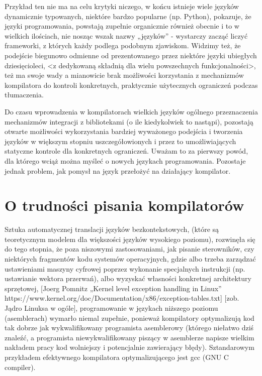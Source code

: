 Przykład ten nie ma na celu krytyki niczego, w końcu istnieje wiele języków dynamicznie typowanych, niektóre bardzo popularne (np. Python), pokazuje,  że języki programowania, powstają zupełnie organicznie również obecnie i to w wielkich ilościach, nie nosząc wszak nazwy „języków” - wystarczy zacząć liczyć frameworki, z których każdy podlega podobnym zjawiskom.
Widzimy też, że podejście biegunowo odmienne od prezentowanego przez niektóre języki ubiegłych dziesięcioleci, <z dedykowaną składnią dla wielu powszechnych funkcjonalności>, też ma swoje wady a mianowicie brak możliwości korzystania z mechanizmów kompilatora do kontroli konkretnych, praktycznie użytecznych ograniczeń podczas tłumaczenia.

Do czasu wprowadzenia w kompilatorach wielkich języków ogólnego przeznaczenia mechanizmów integracji z bibliotekami (o ile kiedykolwiek to nastąpi), pozostają otwarte możliwości wykorzystania bardziej wyważonego podejścia i tworzenia języków w większym stopniu uszczegółowionych i przez to umożliwiających statyczne kontrole dla konkretnych ograniczeń. Uważam to za pierwszy powód, dla którego wciąż można myśleć o nowych językach programowania.
Pozostaje jednak problem, jak pomysł na język przełożyć na działający kompilator.

\section{ O trudności pisania kompilatorów}
Sztuka automatycznej translacji języków bezkontekstowych, (które są teoretycznym modelem dla większości języków wysokiego poziomu), rozwinęła się do tego stopnia, że poza niszowymi zastosowaniami, jak pisanie sterowników, czy niektórych fragmentów kodu systemów operacyjnych, gdzie albo trzeba zarządzać ustawieniami maszyny cyfrowej poprzez wykonanie specjalnych instrukcji (np. ustawianie wektora przerwań), albo wyzyskać własności konkretnej architektury sprzętowej,
[Joerg Pomnitz „Kernel level exception handling in Linux” https://www.kernel.org/doc/Documentation/x86/exception-tables.txt]
[zob. Jądro Linuksa w ogóle], 
programowanie w językach niższego poziomu (asemblerach) wymarło niemal zupełnie, ponieważ kompilatory optymalizują kod tak dobrze jak wykwalifikowany programista asemblerowy (którego niełatwo dziś znaleźć, a programista niewykwalifikowany piszący w asemblerze napisze wielkim nakładem pracy kod wolniejszy i potencjalnie zawierający błędy). Sztandarowym przykładem efektywnego kompilatora optymalizującego jest gcc (GNU C compiler).

